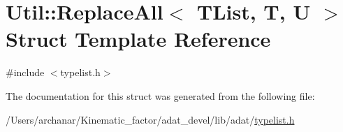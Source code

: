 \hypertarget{structUtil_1_1TL_1_1ReplaceAll}{}\section{Util\+:\+:Replace\+All$<$ T\+List, T, U $>$ Struct Template Reference}
\label{structUtil_1_1TL_1_1ReplaceAll}


{\ttfamily \#include $<$typelist.\+h$>$}



The documentation for this struct was generated from the following file\+:\begin{DoxyCompactItemize}
\item 
/\+Users/archanar/\+Kinematic\+\_\+factor/adat\+\_\+devel/lib/adat/\mbox{\hyperlink{lib_2adat_2typelist_8h}{typelist.\+h}}\end{DoxyCompactItemize}
